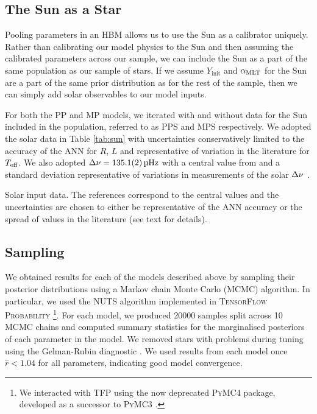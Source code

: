 \subsection{The Sun as a Star}\label{sec:sun}

Pooling parameters in an HBM allows us to use the Sun as a calibrator uniquely. Rather than calibrating our model physics to the Sun and then assuming the calibrated parameters across our sample, we can include the Sun as a part of the same population as our sample of stars. If we assume $Y_\mathrm{init}$ and $\mlt$ for the Sun are a part of the same prior distribution as for the rest of the sample, then we can simply add solar observables to our model inputs.

For both the PP and MP models, we iterated with and without data for the Sun included in the population, referred to as PPS and MPS respectively. We adopted the solar data in Table \ref{tab:sun} with uncertainties conservatively limited to the accuracy of the ANN for $R$, $L$ and representative of variation in the literature for $\teff$. We also adopted $\dnu=\SI{135.1(2)}{\micro\hertz}$ with a central value from \citet{Huber.Bedding.ea2011} and a standard deviation representative of variations in measurements of the solar $\dnu$ \citep{Broomhall.Chaplin.ea2011}.

\begin{table}
    \centering
    \caption[Solar input data.]{Solar input data. The references correspond to the central values and the uncertainties are chosen to either be representative of the ANN accuracy or the spread of values in the literature (see text for details).}
    \label{tab:sun}
    
\end{table}

\subsection{Sampling}\label{sec:sampling}

We obtained results for each of the models described above by sampling their posterior distributions using a Markov chain Monte Carlo (MCMC) algorithm. In particular, we used the NUTS algorithm implemented in \textsc{TensorFlow Probability} \citep[\textsc{TFP};][]{Abadi.Barham.ea2016, Dillon.Langmore.ea2017}\footnote{We interacted with \textsc{TFP} using the now deprecated \textsc{PyMC4} package, developed as a successor to \textsc{PyMC3} \citep{Salvatier.Wiecki.ea2016}.}. For each model, we produced \num{20000} samples split across \num{10} MCMC chains and computed summary statistics for the marginalised posteriors of each parameter in the model. We removed stars with problems during tuning using the Gelman-Rubin diagnostic \citep[$\hat{r}$;][]{Gelman.Rubin1992}. We used results from each model once $\hat{r} < 1.04$ for all parameters, indicating good model convergence.

